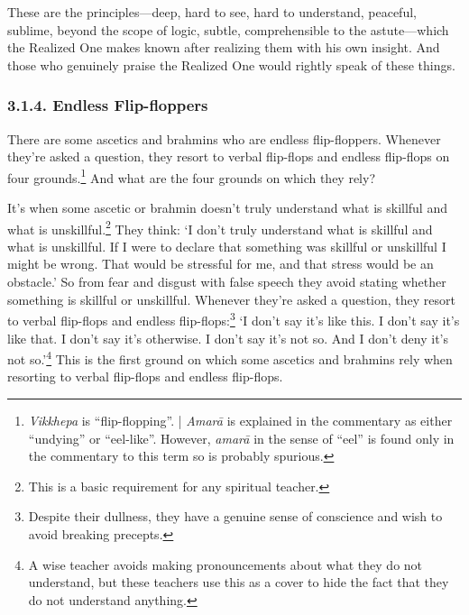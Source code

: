 \documentclass[12pt,openany]{book}%
\begin{document}
These are the principles—deep, hard to see, hard to understand, peaceful, sublime, beyond the scope of logic, subtle, comprehensible to the astute—which the Realized One makes known after realizing them with his own insight. And those who genuinely praise the Realized One would rightly speak of these things. 

\subsubsection*{3.1.4. Endless Flip-floppers }

There are some ascetics and brahmins who are endless flip-floppers. Whenever they’re asked a question, they resort to verbal flip-flops and endless flip-flops on four grounds.\footnote{\textit{Vikkhepa} is “ﬂip-flopping”. | \textit{\textsanskrit{Amarā}} is explained in the commentary as either “undying” or “eel-like”. However, \textit{\textsanskrit{amarā}} in the sense of “eel” is found only in the commentary to this term so is probably spurious. } And what are the four grounds on which they rely? 

It’s when some ascetic or brahmin doesn’t truly understand what is skillful and what is unskillful.\footnote{This is a basic requirement for any spiritual teacher. } They think: ‘I don’t truly understand what is skillful and what is unskillful. If I were to declare that something was skillful or unskillful I might be wrong. That would be stressful for me, and that stress would be an obstacle.’ So from fear and disgust with false speech they avoid stating whether something is skillful or unskillful. Whenever they’re asked a question, they resort to verbal flip-flops and endless flip-flops:\footnote{Despite their dullness, they have a genuine sense of conscience and wish to avoid breaking precepts. } ‘I don’t say it’s like this. I don’t say it’s like that. I don’t say it’s otherwise. I don’t say it’s not so. And I don’t deny it’s not so.’\footnote{A wise teacher avoids making pronouncements about what they do not understand, but these teachers use this as a cover to hide the fact that they do not understand anything. } This is the first ground on which some ascetics and brahmins rely when resorting to verbal flip-flops and endless flip-flops. 
\end{document}
